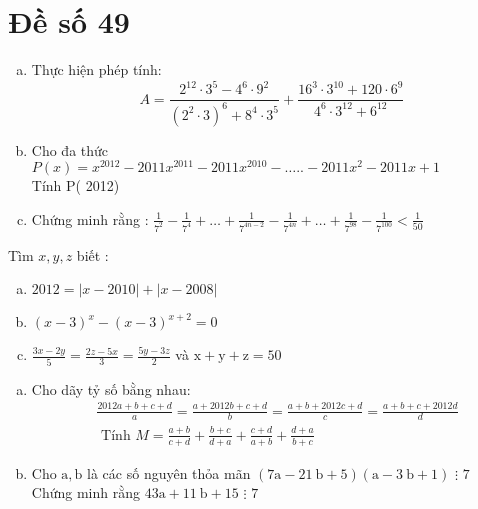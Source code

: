 \section{Đề số 49}

\begin{bt} 
	\hfill
	\begin{enumerate}[a.]
		\item Thực hiện phép tính:
		$$
		A=\frac{2^{12} \cdot 3^5-4^6 \cdot 9^2}{\left(2^2 \cdot 3\right)^6+8^4 \cdot 3^5}+\frac{16^3 \cdot 3^{10}+120 \cdot 6^9}{4^6 \cdot 3^{12}+6^{12}}
		$$
		\item Cho đa thức $P(x)=x^{2012}-2011 x^{2011}-2011 x^{2010}-\ldots . .-2011 x^2-2011 x+1$ \\Tính P( 2012)
		\item Chứng minh rằng : $\frac{1}{7^2}-\frac{1}{7^4}+\ldots+\frac{1}{7^{4 n-2}}-\frac{1}{7^{4 n}}+\ldots+\frac{1}{7^{98}}-\frac{1}{7^{100}}<\frac{1}{50}$
	\end{enumerate}
	\loigiai{} 
\end{bt}

\begin{bt}
	Tìm $x, y, z$ biết :
	\begin{enumerate}[a.]
		\item $2012=|x-2010|+|x-2008|$
		\item $(x-3)^x-(x-3)^{x+2}=0$
		\item $\frac{3 x-2 y}{5}=\frac{2 z-5 x}{3}=\frac{5 y-3 z}{2}$ và $\mathrm{x}+\mathrm{y}+\mathrm{z}=50$
	\end{enumerate}
	\loigiai{} 
\end{bt}

\begin{bt}
	\hfill
	\begin{enumerate}[a.]
		\item Cho dãy tỷ số bằng nhau:
		$$
		\begin{aligned}
			& \frac{2012 a+b+c+d}{a}=\frac{a+2012 b+c+d}{b}=\frac{a+b+2012 c+d}{c}=\frac{a+b+c+2012 d}{d} \\
			& \text { Tính } M=\frac{a+b}{c+d}+\frac{b+c}{d+a}+\frac{c+d}{a+b}+\frac{d+a}{b+c}
		\end{aligned}
		$$
		\item Cho $\mathrm{a}, \mathrm{b}$ là các số nguyên thỏa mãn $(7 \mathrm{a}-21 \mathrm{~b}+5)(\mathrm{a}-3 \mathrm{~b}+1)$ $\vdots$ $ 7$ \\Chứng minh rằng $43 \mathrm{a}+11 \mathrm{~b}+15$ $\vdots$ $ 7$
	\end{enumerate}
	
	\loigiai{} 
\end{bt}

